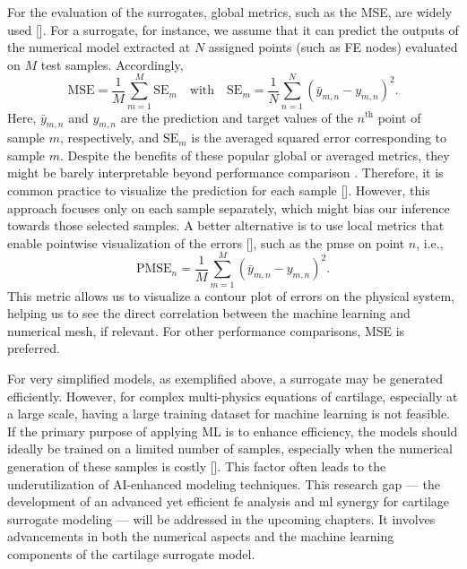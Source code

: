 For the evaluation of the surrogates, global metrics, such as the MSE, are widely used [\cite{phellan2021}]. For a surrogate, for instance, we assume that it can predict the outputs of the numerical model extracted at \( N \) assigned points (such as FE nodes) evaluated on \( M \) test samples. Accordingly,
%
\begin{equation}\label{eq:msem}
    \text{MSE} = \frac{1}{M}\sum_{m=1}^{M}\text{SE}_m
    \quad \text{with} \quad
    \text{SE}_m = \frac{1}{N}\sum_{n=1}^{N}
    (\bar{y}_{m,n} - y_{m,n})^2.
\end{equation}
%
Here, \( \bar{y}_{m,n} \) and \( y_{m,n} \) are the prediction and target values of the \( n^{\text{th}} \) point of sample \( m \), respectively, and \( \text{SE}_m \) is the averaged squared error corresponding to sample \( m \). Despite the benefits of these popular global or averaged metrics, they might be barely interpretable beyond performance comparison \cite{molnar2019}. Therefore, it is common practice to visualize the prediction for each sample [\cite{sanchez2020}]. However, this approach focuses only on each sample separately, which might bias our inference towards those selected samples. A better alternative is to use local metrics that enable pointwise visualization of the errors [\cite{giselle2019}], such as the \ac{pmse} on point \( n \), i.e.,
%
\begin{equation}\label{eq:pmse}
    \text{PMSE}_n = \frac{1}{M}\sum_{m=1}^{M}
    (\bar{y}_{m,n} - y_{m,n})^2.
\end{equation}
%
This metric allows us to visualize a contour plot of errors on the physical system, helping us to see the direct correlation between the machine learning and numerical mesh, if relevant. For other performance comparisons, MSE is preferred.

For very simplified models, as exemplified above, a surrogate may be generated efficiently. However, for complex multi-physics equations of cartilage, especially at a large scale, having a large training dataset for machine learning is not feasible. If the primary purpose of applying ML is to enhance efficiency, the models should ideally be trained on a limited number of samples, especially when the numerical generation of these samples is costly [\cite{forrester2008}]. This factor often leads to the underutilization of AI-enhanced modeling techniques. This research gap — the development of an advanced yet efficient \ac{fe} analysis and \ac{ml} synergy for cartilage surrogate modeling — will be addressed in the upcoming chapters. It involves advancements in both the numerical aspects and the machine learning components of the cartilage surrogate model.

